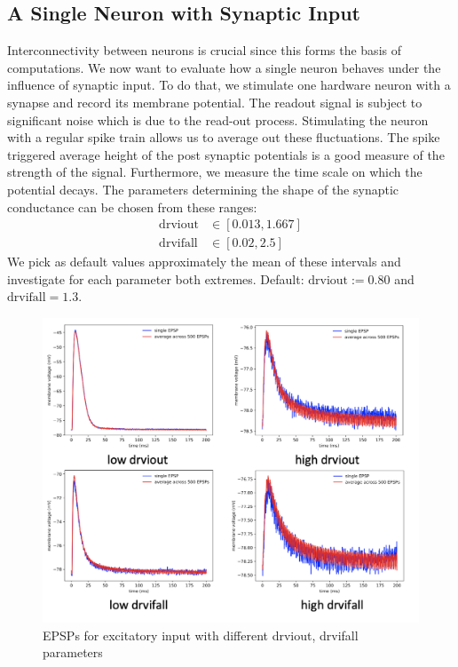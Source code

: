 \documentclass[a4paper,twocolumn]{article}
\begin{document}
\subsection{A Single Neuron with Synaptic Input}
Interconnectivity between neurons is crucial since this forms the basis of
computations.  We now want to evaluate how a single neuron behaves under the influence
 of synaptic input.  To do that,  we stimulate one hardware neuron with a synapse
 and record its membrane potential.  The readout signal is subject to significant
 noise which is due to the read-out process.  Stimulating the neuron with a regular
 spike train allows us to average out these fluctuations.  The spike triggered average
 height of the post synaptic potentials is a good measure of the strength of the signal.
 Furthermore,  we measure the time scale on which the potential decays.
The parameters determining the shape of the synaptic conductance can be chosen
from these ranges:
\begin{align*}
	\text{drviout} &\in \left[ 0.013, 1.667  \right] \\
	\text{drvifall} &\in \left[ 0.02,  2.5  \right]
\end{align*}
We pick as default values approximately the mean of these intervals and
investigate for each parameter both extremes.  Default: $\text{drviout} := 0.80$
and $\text{drvifall}=1.3$.
 \begin{figure}[ht]
     \centering
     \includegraphics[width=.5\textwidth]{figures/epsp_summary.png}
     \caption{EPSPs for excitatory input with different drviout,  drvifall 
     parameters}
     \label{fig:epsp_default}
 \end{figure}
\end{document}
